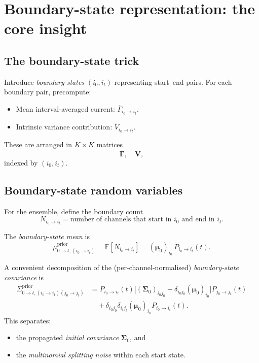 \documentclass[11pt]{article}
\begin{document}
\section{Boundary-state representation: the core insight}

\subsection{The boundary-state trick}

Introduce \emph{boundary states} \((i_0,i_t)\) representing start--end pairs. For each boundary pair, precompute:
\begin{itemize}
  \item Mean interval-averaged current: \(\overline{\Gamma}_{i_0 \to i_t}\).
  \item Intrinsic variance contribution: \(\overline{V}_{i_0 \to i_t}\).
\end{itemize}
These are arranged in \(K \times K\) matrices
\[
  \overline{\mathbf{\Gamma}},\quad
  \overline{\mathbf{V}},
\]
indexed by \((i_0,i_t)\).

\subsection{Boundary-state random variables}

For the ensemble, define the boundary count
\[
  N_{i_0\to i_t}
  =
  \text{number of channels that start in } i_0
  \text{ and end in } i_t.
\]

The \emph{boundary-state mean} is
\[
  \mu^{\text{prior}}_{0\to t,(i_0\to i_t)}
  =
  \mathbb{E}[N_{i_0\to i_t}]
  =
  (\boldsymbol{\mu}_0)_{i_0}\,P_{i_0\to i_t}(t).
\]

A convenient decomposition of the (per-channel-normalised) \emph{boundary-state covariance} is
\begin{align*}
  \Sigma^{\text{prior}}_{0\to t,(i_0\to i_t)(j_0\to j_t)}
  &=
  P_{i_0\to i_t}(t)
  \bigl[(\boldsymbol{\Sigma}_0)_{i_0 j_0}
        - \delta_{i_0 j_0}(\boldsymbol{\mu}_0)_{i_0}\bigr]
  P_{j_0\to j_t}(t) \\
  &\quad
  +\delta_{i_0 j_0}\delta_{i_t j_t}
  (\boldsymbol{\mu}_0)_{i_0}P_{i_0\to i_t}(t).
\end{align*}
This separates:
\begin{itemize}
  \item the propagated \emph{initial covariance} \(\boldsymbol{\Sigma}_0\), and
  \item the \emph{multinomial splitting noise} within each start state.
\end{itemize}
\end{document}

